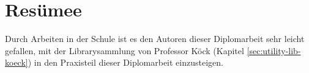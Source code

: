 \chapter{Resümee}
Durch Arbeiten in der Schule ist es den Autoren dieser Diplomarbeit sehr leicht gefallen, mit der Librarysammlung von Professor Köck (Kapitel \ref{sec:utility-lib-koeck}) in den Praxisteil dieser Diplomarbeit einzusteigen.